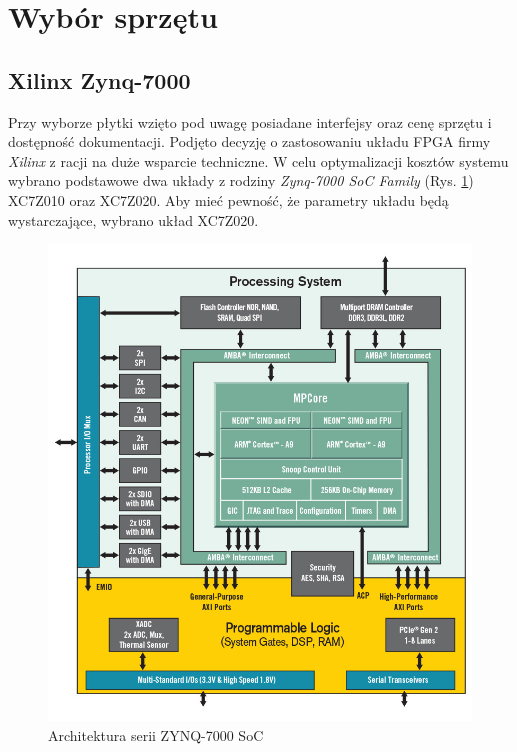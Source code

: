 \newpage %
\cleardoublepage %
\pagestyle{headings}

\section{Wybór sprzętu}

\subsection{Xilinx Zynq-7000}

Przy wyborze płytki wzięto pod uwagę posiadane interfejsy oraz cenę sprzętu i dostępność dokumentacji. Podjęto decyzję o zastosowaniu układu FPGA firmy \emph{Xilinx} z racji na duże wsparcie techniczne. W celu optymalizacji kosztów systemu wybrano podstawowe dwa układy z rodziny \emph{Zynq-7000 SoC Family} (Rys. \ref{zynq7000}) XC7Z010 oraz XC7Z020. Aby mieć pewność, że parametry układu będą wystarczające, wybrano układ XC7Z020. 

\begin{figure}[h]
  \centering
  \includegraphics[width=\textwidth]{img/zynq7000.png}
  \caption{Architektura serii ZYNQ-7000 SoC \cite{zynq-7000}}
  \label{zynq7000}
\end{figure}

